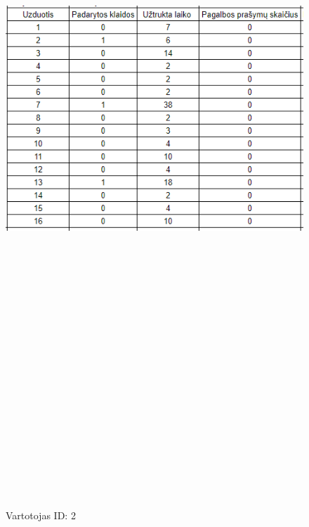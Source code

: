 \documentclass[oneside]{VUMIFPSkursinis}
\begin{document}
	\begin{figure}[h]
			\centering
			\includegraphics[width=15cm,height=60cm,keepaspectratio]{2.png}
			\caption{ Vartotojas ID: 2}
	\end{figure}
\end{document}
